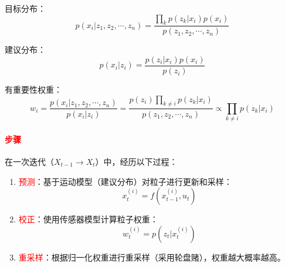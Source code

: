 \documentclass[
12pt, %
a4paper, 
oneside, %
]{scrartcl}
\begin{document}
目标分布：
$$ p(x_i|z_1, z_2, \cdots, z_n) = \frac{\prod_k p(z_k|x_i)p(x_i)}{p(z_1, z_2, \cdots, z_n)} $$

建议分布：
$$ p(x_i|z_i) = \frac{p(z_i|x_i)p(x_i)}{p(z_i)} $$

有重要性权重：
$$ w_i = \frac{p(x_i|z_1, z_2, \cdots, z_n)}{p(x_i|z_i)} = \frac{p(z_i)\prod_{k \neq i}p(z_k|x_i)}{p(z_1, z_2, \cdots, z_n)} \propto \prod_{k \neq i}p(z_k|x_i) $$
\paragraph{\textcolor{red}{步骤}}
在一次迭代（$ X_{t - 1} \rightarrow X_t $）中，经历以下过程：
\begin{enumerate}
\item \textcolor{red}{预测}：基于运动模型（建议分布）对粒子进行更新和采样：
$$ x_t^{(i)} = f(x_{t - 1}^{(i)}, u_t) $$
\item \textcolor{red}{校正}：使用传感器模型计算粒子权重：
$$ w_t^{(i)} = p(z_t|x_t^{(i)}) $$
\item \textcolor{red}{重采样}：根据归一化权重进行重采样（采用轮盘赌），权重越大概率越高。
\end{enumerate}
\end{document}
